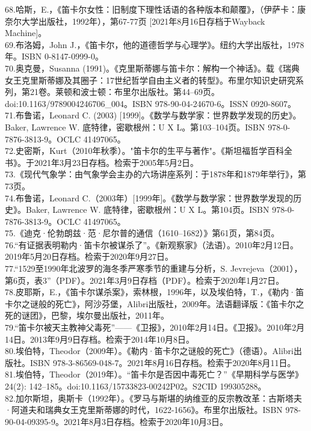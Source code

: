 68.哈斯，E.，《笛卡尔女性：旧制度下理性话语的各种版本和颠覆》，（伊萨卡：康奈尔大学出版社，1992年），第67-77页 [2021年8月16日存档于Wayback Machine]。\\
69.布洛姆，John J.，《笛卡尔，他的道德哲学与心理学》。纽约大学出版社，1978年。ISBN 0-8147-0999-0。\\
70.奥克曼，Susanna (1991)。《克里斯蒂娜与笛卡尔：解构一个神话》。载《瑞典女王克里斯蒂娜及其圈子：17世纪哲学自由主义者的转型》。布里尔知识史研究系列，第21卷。莱顿和波士顿：布里尔出版社。第44–69页。doi:10.1163/9789004246706_004。ISBN 978-90-04-24670-6。ISSN 0920-8607。\\
71.布鲁诺，Leonard C. (2003) [1999]。《数学与数学家：世界数学发现的历史》。Baker, Lawrence W. 底特律，密歇根州：U X L。第103–104页。ISBN 978-0-7876-3813-9。OCLC 41497065。\\
72.史密斯，Kurt（2010年秋季）。"笛卡尔的生平与著作"。《斯坦福哲学百科全书》。于2021年3月23日存档。检索于2005年5月2日。\\
73.《现代气象学：由气象学会主办的六场讲座系列：于1878年和1879年举行》，第73页。\\
74.布鲁诺，Leonard C.（2003年）[1999年]。《数学与数学家：世界数学发现的历史》。Baker, Lawrence W. 底特律，密歇根州：U X L。第104页。ISBN 978-0-7876-3813-9。OCLC 41497065。\\
75.《迪克·伦勃朗兹·范·尼尔普的通信（1610–1682）》第61页，第84页。\\
76.“有证据表明勒内·笛卡尔被谋杀了”。《新观察家》（法语）。2010年2月12日。2019年5月20日存档。检索于2020年9月27日。\\
77.“1529至1990年北波罗的海冬季严寒季节的重建与分析，S. Jevrejeva（2001），第6页，表3”（PDF）。2021年3月9日存档（PDF）。检索于2020年1月27日。\\
78.皮耶斯，E.，《笛卡尔谋杀案》，索林根，1996年，以及埃伯特，T.，《勒内·笛卡尔之谜般的死亡》，阿沙芬堡，Alibri出版社，2009年。法语翻译版：《笛卡尔之死的谜团》，巴黎，埃尔曼出版社，2011年。\\
79.“笛卡尔被天主教神父毒死”——《卫报》，2010年2月14日。《卫报》。2010年2月14日。2013年9月9日存档。检索于2014年10月8日。\\
80.埃伯特，Theodor（2009年）。《勒内·笛卡尔之谜般的死亡》（德语）。Alibri出版社。ISBN 978-3-86569-048-7。2021年8月16日存档。检索于2020年8月11日。\\
81.埃伯特，Theodor（2019年）。“笛卡尔是否因中毒死亡？”《早期科学与医学》24(2): 142–185。doi:10.1163/15733823-00242P02。S2CID 199305288。\\
82.加尔斯坦，奥斯卡（1992年）。《罗马与斯堪的纳维亚的反宗教改革：古斯塔夫·阿道夫和瑞典女王克里斯蒂娜的时代，1622-1656》。布里尔出版社。ISBN 978-90-04-09395-9。2021年8月3日存档。检索于2020年10月3日。\\
